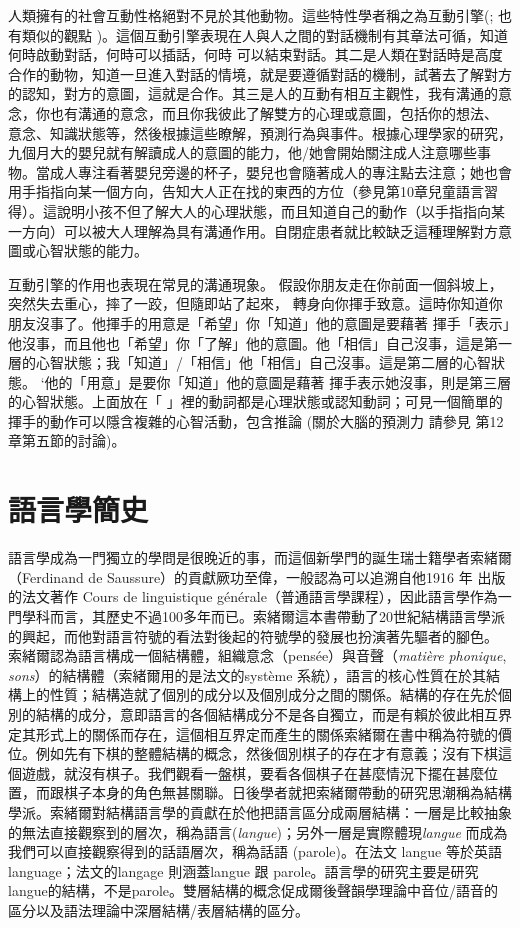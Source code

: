 人類擁有的社會互動性格絕對不見於其他動物。這些特性學者稱之為互動引擎(\citealt{EnfieldLevinson2006}; \citealt{Pagel2012} 也有類似的觀點 )。這個互動引擎表現在人與人之間的對話機制有其章法可循，知道何時啟動對話，何時可以插話，何時 可以結束對話。其二是人類在對話時是高度合作的動物，知道一旦進入對話的情境，就是要遵循對話的機制，試著去了解對方的認知，對方的意圖，這就是合作。其三是人的互動有相互主觀性，我有溝通的意念，你也有溝通的意念，而且你我彼此了解雙方的心理或意圖，包括你的想法、 意念、知識狀態等，然後根據這些瞭解，預測行為與事件。根據心理學家的研究，九個月大的嬰兒就有解讀成人的意圖的能力，他/她會開始關注成人注意哪些事物。當成人專注看著嬰兒旁邊的杯子，嬰兒也會隨著成人的專注點去注意；她也會用手指指向某一個方向，告知大人正在找的東西的方位（參見第10章兒童語言習得）。這說明小孩不但了解大人的心理狀態，而且知道自己的動作（以手指指向某一方向）可以被大人理解為具有溝通作用。自閉症患者就比較缺乏這種理解對方意圖或心智狀態的能力。

互動引擎的作用也表現在常見的溝通現象。 假設你朋友走在你前面一個斜坡上， 突然失去重心，摔了一跤，但隨即站了起來， 轉身向你揮手致意。這時你知道你朋友沒事了。他揮手的用意是「希望」你「知道」他的意圖是要藉著 揮手「表示」他沒事，而且他也「希望」你「了解」他的意圖。他「相信」自己沒事，這是第一層的心智狀態；我「知道」/「相信」他「相信」自己沒事。這是第二層的心智狀態。 ‘他的「用意」是要你「知道」他的意圖是藉著 揮手表示她沒事，則是第三層的心智狀態。上面放在「  」裡的動詞都是心理狀態或認知動詞；可見一個簡單的揮手的動作可以隱含複雜的心智活動，包含推論 (關於大腦的預測力 請參見 第12章第五節的討論)。    

\section{語言學簡史}

語言學成為一門獨立的學問是很晚近的事，而這個新學門的誕生瑞士籍學者索緒爾（Ferdinand de Saussure）的貢獻厥功至偉，一般認為可以追溯自他1916 年 出版的法文著作 Cours de linguistique générale（普通語言學課程），因此語言學作為一門學科而言，其歷史不過100多年而已。索緒爾這本書帶動了20世紀結構語言學派的興起，而他對語言符號的看法對後起的符號學的發展也扮演著先驅者的腳色。 索緒爾認為語言構成一個結構體，組織意念（pensée）與音聲（\textit{matière} \textit{phonique}, \textit{sons}）的結構體（索緒爾用的是法文的système 系統），語言的核心性質在於其結構上的性質；結構造就了個別的成分以及個別成分之間的關係。結構的存在先於個別的結構的成分，意即語言的各個結構成分不是各自獨立，而是有賴於彼此相互界定其形式上的關係而存在，這個相互界定而產生的關係索緒爾在書中稱為符號的價位。例如先有下棋的整體結構的概念，然後個別棋子的存在才有意義；沒有下棋這個遊戲，就沒有棋子。我們觀看一盤棋，要看各個棋子在甚麼情況下擺在甚麼位置，而跟棋子本身的角色無甚關聯。日後學者就把索緒爾帶動的研究思潮稱為結構學派。索緒爾對結構語言學的貢獻在於他把語言區分成兩層結構：一層是比較抽象的無法直接觀察到的層次，稱為語言(\textit{langue})；另外一層是實際體現\textit{langue} 而成為我們可以直接觀察得到的話語層次，稱為話語 (parole)。在法文 langue 等於英語  language；法文的langage 則涵蓋langue 跟 parole。語言學的研究主要是研究langue的結構，不是parole。雙層結構的概念促成爾後聲韻學理論中音位/語音的區分以及語法理論中深層結構/表層結構的區分。  

